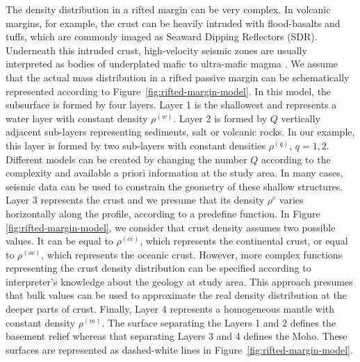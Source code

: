 \documentclass[manuscript]{geophysics}
\begin{document}
The density distribution in a rifted margin can be very complex.
In volcanic margins, for example, the crust can be heavily intruded with
flood-basalts and tuffs, which are commonly imaged as Seaward Dipping Reflectors (SDR).
Underneath this intruded crust, high-velocity seismic zones are usually interpreted 
as bodies of underplated mafic to ultra-mafic magma \citep{geoffroy2005}.
We assume that the actual mass distribution in a rifted passive margin can be 
schematically represented according to Figure~\ref{fig:rifted-margin-model}. 
In this model, the subsurface is formed by four layers. 
Layer 1 is the shallowest and represents a water layer with constant density
$\rho^{(w)}$. 
Layer 2 is formed by $Q$ vertically adjacent sub-layers representing 
sediments, salt or volcanic rocks.
In our example, this layer is formed by two sub-layers with constant densities
$\rho^{(q)}$, $q = 1, 2$. Different models can be created by changing the number $Q$
according to the complexity and available a priori information at the study area.
In many cases, seismic data can be used to constrain the geometry of these 
shallow structures.
Layer 3 represents the crust and we presume that its density $\rho^{c}$
varies horizontally along the profile, according to a predefine function.
In Figure \ref{fig:rifted-margin-model}, we consider that crust density assumes 
two possible values. It can be equal to $\rho^{(cc)}$, which
represents the continental crust, or equal to $\rho^{(oc)}$, which represents the
oceanic crust.
However, more complex functions representing the crust density distribution can be
specified according to interpreter's knowledge about the geology at study area.
This approach presumes that bulk values can be used 
to approximate the real density distribution at the deeper parts of crust. 
Finally, Layer 4 represents a homogeneous mantle with constant density $\rho^{(m)}$. 
The surface separating the Layers 1 and 2 defines the basement relief whereas
that separating Layers 3 and 4 defines the Moho. These surfaces are
represented as dashed-white lines in Figure~\ref{fig:rifted-margin-model}.
\end{document}
